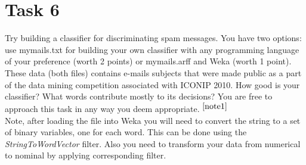 \documentclass{article}
\newcommand{\footref}[1]{%
    $^{\ref{#1}}$%
}
\begin{document}
\section*{Task 6}
Try building a classifier for discriminating spam messages. You have two options: use my\textunderscore mails.txt for building your own classifier with any programming language of your preference (worth 2 points) or my\textunderscore mails.arff and Weka (worth 1 point). These data (both files) contains e-mails subjects that were made public as a part of the data mining competition associated with ICONIP 2010. How good is your classifier? What words contribute mostly to its decisions? You are free to approach this task in any way you deem appropriate.\footref{note1}\\

Note, after loading the file into Weka you will need to convert the string to a set of binary variables, one for each word. This can be done using the \emph{StringToWordVector} filter. Also you need to transform your data from numerical to nominal by applying corresponding filter. 
\end{document}
